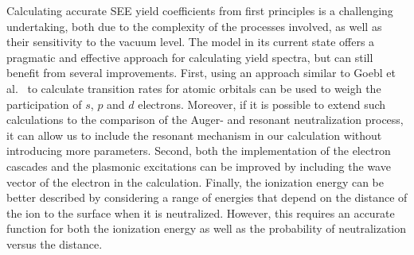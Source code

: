 \begin{refsection}
Calculating accurate \gls{SEE} yield coefficients from first principles is a 
challenging undertaking, both due to the complexity of the processes involved, 
as well as their sensitivity to the vacuum level. The model in its current state 
offers a pragmatic and effective approach for calculating yield spectra, but 
can still benefit from several improvements. First, using an approach similar to 
Goebl et al.~\cite{Goebl2011} to calculate transition rates for atomic orbitals 
can be used to weigh the participation of $s$, $p$ and $d$ electrons. Moreover, if 
it is possible to extend such calculations to the comparison of the Auger- and resonant
neutralization process, it can allow us to include the resonant mechanism in our 
calculation without introducing more parameters. Second, both 
the implementation of the electron cascades and the plasmonic excitations can be 
improved by including the wave vector of the electron in the 
calculation. Finally, the ionization energy can be better described by considering 
a range of energies that depend on the distance of the ion to the surface when it 
is neutralized. However, this requires an accurate function for both the ionization 
energy as well as the probability of neutralization versus the distance. 
 
\printbibliography 
\end{refsection} 
